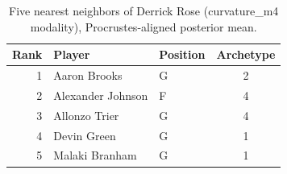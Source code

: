 \begin{table}[htbp]
  \centering\small
  \begin{tabular}{rllc}
    \toprule
    Rank & Player & Position & Archetype \\
    \midrule
    1 & Aaron Brooks & G & 2 \\
    2 & Alexander Johnson & F & 4 \\
    3 & Allonzo Trier & G & 4 \\
    4 & Devin Green & G & 1 \\
    5 & Malaki Branham & G & 1 \\
    \bottomrule
  \end{tabular}
  \caption{Five nearest neighbors of Derrick Rose (curvature_m4 modality), Procrustes-aligned posterior mean.}
  \label{tab:Derrick_Rose_neighbors_curvature_m4}
\end{table}

